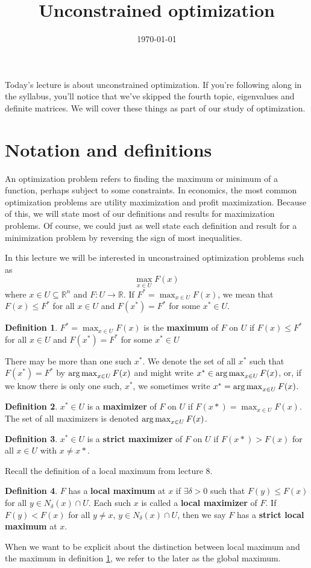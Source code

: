 \documentclass[12pt,reqno]{amsart}
\title{Unconstrained optimization}
\date{\today}
\theoremstyle{definition}
\newtheorem{definition}{Definition}[section]
\newcommand{\argmax}{\operatornamewithlimits{arg\,max}}
\def\R{\mathbb{R}}
\renewcommand{\to}{{\rightarrow}}
\begin{document}
\maketitle

Today's lecture is about unconstrained optimization. If you're
following along in the syllabus, you'll notice that we've skipped the
fourth topic, eigenvalues and definite matrices. We will cover these
things as part of our study of optimization. 

\section{Notation and definitions}
An optimization problem refers to finding the maximum or minimum of a
function, perhaps subject to some constraints. In economics, the most
common optimization problems are utility maximization and profit
maximization. Because of this, we will state most of our definitions
and results for maximization problems. Of course, we could just as
well state each definition and result for a minimization problem by
reversing the sign of most inequalities.

In this lecture we will be interested in unconstrained optimization
problems such as
\[ \max_{x\in U} F(x) \]
where $x \in U \subseteq \R^n$ and $F: U \to \R$. If $F^* =
\max_{x\in U} F(x)$, we
mean that $F(x) \leq F^*$ for all $x \in U$ and $F(x^*) = F^*$ for
some $x^* \in U$. 
\begin{definition}\label{d:max}
  $F^* = \max_{x \in U} F(x)$ is the \textbf{maximum} of $F$ on $U$ if
  $F(x) \leq F^*$ for all $x \in U$ and $F(x^*) = F^*$ for some $x^*
  \in U$
\end{definition}
There may be more than one such $x^*$. We denote the set of all $x^*$
such that $F(x^*) = F^*$ by $\argmax_{x \in U} F(x)$ and might write
$x^* \in \argmax_{x \in U} F(x)$, or, if we know there is only one
such, $x^*$, we sometimes write $x^* = \argmax_{x \in U} F(x)$.
\begin{definition} \label{d:maxer}
  $x^* \in U$ is a \textbf{maximizer} of $F$ on $U$ if $F(x*)
  = \max_{x \in U} 
  F(x)$. The set of all maximizers is denoted $\argmax_{x \in U}
  F(x)$.
\end{definition}
\begin{definition}\label{d:smaxer}
  $x^* \in U$ is a \textbf{strict maximizer} of $F$ on $U$ if $F(x*) > F(x)
  $ for all $x \in U$ with $x \neq x*$. 
\end{definition}
Recall the definition of a local maximum from lecture 8.
\begin{definition}\label{d:lmax}
  $F$ has a \textbf{local maximum} at $x$ if $\exists \delta > 0$ such
  that $F(y) \leq F(x)$ for all $y \in  N_\delta(x) \cap U$. Each such
  $x$ is called a \textbf{local maximizer} of $F$. If $F(y) < F(x)$
  for all $y \neq x$, $y \in N_\delta(x) \cap U$, then we say $F$ has
  a \textbf{strict local maximum} at $x$.
\end{definition}
When we want to be explicit about the distinction between local
maximum and the maximum in definition \ref{d:max}, we refer to the
later as the global maximum.  
\end{document}
